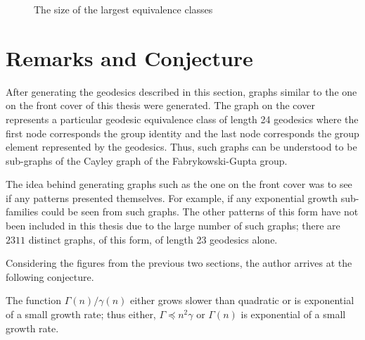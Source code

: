 \begin{figure}[!h]
	\caption{The size of the largest equivalence classes}
	\label{fig:maximumEquivClassSize}
\end{figure}

\section{Remarks and Conjecture}

After generating the geodesics described in this section, graphs similar to the one on the front cover of this thesis were generated.
The graph on the cover represents a particular geodesic equivalence class of length 24 geodesics where the first node corresponds the group identity and the last node corresponds the group element represented by the geodesics.
Thus, such graphs can be understood to be sub-graphs of the Cayley graph of the Fabrykowski-Gupta group.

The idea behind generating graphs such as the one on the front cover was to see if any patterns presented themselves.
For example, if any exponential growth sub-families could be seen from such graphs.
The other patterns of this form have not been included in this thesis due to the large number of such graphs; there are $2311$ distinct graphs, of this form, of length 23 geodesics alone.

Considering the figures from the previous two sections, the author arrives at the following conjecture.

\begin{conjecture}
	The function $\Gamma(n)/\gamma(n)$ either grows slower than quadratic or is exponential of a small growth rate; thus either, $\Gamma \preccurlyeq n^2 \gamma$ or $\Gamma(n)$ is exponential of a small growth rate.
\end{conjecture}


